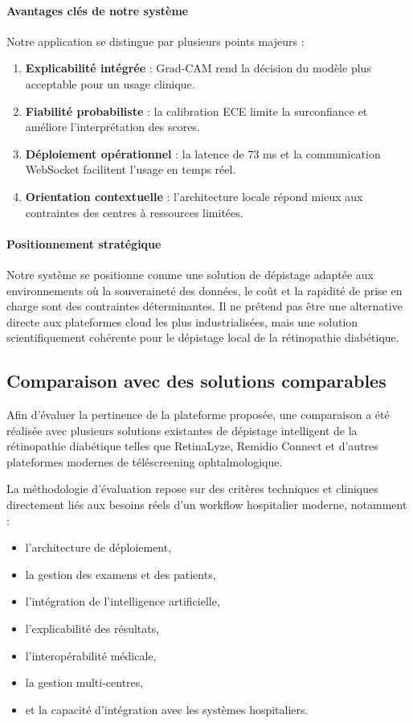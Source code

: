 \documentclass[12pt,a4paper,oneside]{report}
\begin{document}
\paragraph{Avantages clés de notre système}
Notre application se distingue par plusieurs points majeurs :
\begin{enumerate}
    \item \textbf{Explicabilité intégrée} : Grad-CAM rend la décision du modèle plus acceptable pour un usage clinique.
    \item \textbf{Fiabilité probabiliste} : la calibration ECE limite la surconfiance et améliore l'interprétation des scores.
    \item \textbf{Déploiement opérationnel} : la latence de 73 ms et la communication WebSocket facilitent l'usage en temps réel.
    \item \textbf{Orientation contextuelle} : l'architecture locale répond mieux aux contraintes des centres à ressources limitées.
\end{enumerate}

\paragraph{Positionnement stratégique}
Notre système se positionne comme une solution de dépistage adaptée aux
environnements où la souveraineté des données, le coût et la rapidité de
prise en charge sont des contraintes déterminantes. Il ne prétend pas être
une alternative directe aux plateformes cloud les plus industrialisées, mais
une solution scientifiquement cohérente pour le dépistage local de la
rétinopathie diabétique.

\subsection{Comparaison avec des solutions comparables}

Afin d'évaluer la pertinence de la plateforme proposée, une comparaison a été
réalisée avec plusieurs solutions existantes de dépistage intelligent de la
rétinopathie diabétique telles que RetinaLyze, Remidio Connect et d'autres
plateformes modernes de téléscreening ophtalmologique.

La méthodologie d'évaluation repose sur des critères techniques et cliniques
directement liés aux besoins réels d'un workflow hospitalier moderne, notamment :
\begin{itemize}
    \item l'architecture de déploiement,
    \item la gestion des examens et des patients,
    \item l'intégration de l'intelligence artificielle,
    \item l'explicabilité des résultats,
    \item l'interopérabilité médicale,
    \item la gestion multi-centres,
    \item et la capacité d'intégration avec les systèmes hospitaliers.
\end{itemize}
\end{document}
